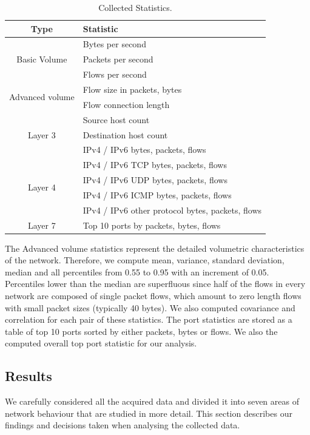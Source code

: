 \begin{table}[!t]
        \centering
        \renewcommand{\arraystretch}{1.1}
        \begin{tabular}{|c|l|} \hline
            \textbf{Type} & \textbf{Statistic} \\ \hline
            \multirow{3}{*}{Basic Volume} & Bytes per second \\
            & Packets per second \\
            & Flows per second \\ \hline
            \multirow{2}{*}{Advanced volume} & Flow size in packets, bytes \\
            & Flow connection length \\ \hline
            \multirow{3}{*}{Layer 3} & Source host count \\
            & Destination host count \\
            & IPv4 / IPv6 bytes, packets, flows \\ \hline
            \multirow{4}{*}{Layer 4} & IPv4 / IPv6 TCP bytes, packets, flows \\
            & IPv4 / IPv6 UDP bytes, packets, flows \\
            & IPv4 / IPv6 ICMP bytes, packets, flows \\
            & IPv4 / IPv6 other protocol bytes, packets, flows \\ \hline
            \multirow{1}{*}{Layer 7} & Top 10 ports by packets, bytes, flows \\
            \hline
        \end{tabular}
        \caption{Collected Statistics.}
        \label{tab:characterization-collected-statistics}
\end{table}

The Advanced volume statistics represent the detailed volumetric characteristics of the network. Therefore, we compute mean, variance, standard deviation, median and all percentiles from 0.55 to 0.95 with an increment of 0.05. Percentiles lower than the median are superfluous since half of the flows in every network are composed of single packet flows, which amount to zero length flows with small packet sizes (typically 40 bytes). We also computed covariance and correlation for each pair of these statistics. The port statistics are stored as a table of top 10 ports sorted by either packets, bytes or flows. We also the computed overall top port statistic for our analysis.

\subsection{Results} \label{subsec:characterization-results}
We carefully considered all the acquired data and divided it into seven areas of network behaviour that are studied in more detail. This section describes our findings and decisions taken when analysing the collected data.


